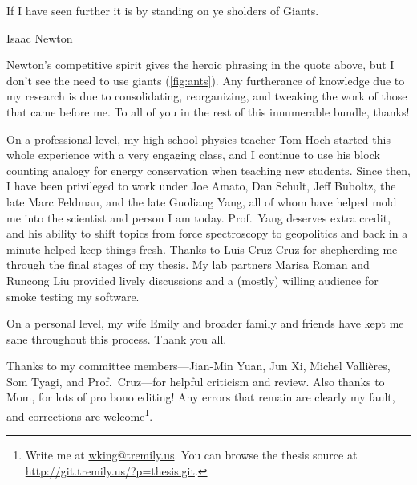 \begin{acknowledgments}
\epigraph{If I have seen further it is by standing on ye sholders of
  Giants.}{Isaac Newton\citep{turnbull59}}

Newton's competitive spirit gives the heroic phrasing in the quote
above, but I don't see the need to use giants (\cref{fig:ants}).  Any
furtherance of knowledge due to my research is due to consolidating,
reorganizing, and tweaking the work of those that came before me.  To
all of you in the rest of this innumerable bundle, thanks!

On a professional level, my high school physics teacher Tom Hoch
started this whole experience with a very engaging class, and I
continue to use his block counting analogy for energy conservation
when teaching new students.  Since then, I have been privileged to
work under Joe Amato, Dan Schult, Jeff Buboltz, the late Marc Feldman,
and the late Guoliang Yang, all of whom have helped mold me into the
scientist and person I am today.  Prof.~Yang deserves extra credit,
and his ability to shift topics from force spectroscopy to geopolitics
and back in a minute helped keep things fresh.  Thanks to Luis Cruz
Cruz for shepherding me through the final stages of my thesis.  My lab
partners Marisa Roman and Runcong Liu provided lively discussions and
a (mostly) willing audience for smoke testing my software.

On a personal level, my wife Emily and broader family and friends have
kept me sane throughout this process.  Thank you all.

Thanks to my committee members---Jian-Min Yuan, Jun Xi, Michel
Valli{\`e}res, Som Tyagi, and Prof.~Cruz---for helpful criticism and
review.  Also thanks to Mom, for lots of pro bono editing!  Any errors
that remain are clearly my fault, and corrections are
welcome\footnote{%
  Write me at \href{mailto:wking@tremily.us}{wking@tremily.us}.  You
  can browse the thesis source at
  \url{http://git.tremily.us/?p=thesis.git}.
}.


\end{acknowledgments}

